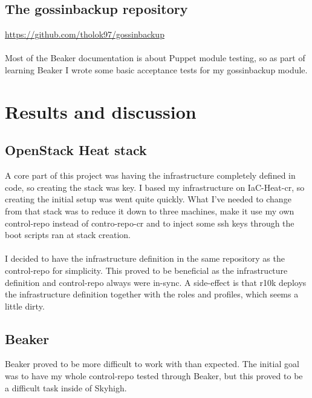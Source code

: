 \subsection{The gossinbackup repository}

\url{https://github.com/tholok97/gossinbackup}
\\
\\
Most of the Beaker documentation is about Puppet module testing, so as part of learning Beaker I wrote some basic acceptance tests for my gossinbackup module.


\section{Results and discussion}

\subsection{OpenStack Heat stack}

A core part of this project was having the infrastructure completely defined in code, so creating the stack was key. I based my infrastructure on IaC-Heat-cr\cite{iacheatcrgithub}, so creating the initial setup was went quite quickly. What I've needed to change from that stack was to reduce it down to three machines, make it use my own control-repo instead of contro-repo-cr\cite{controlrepocr} and to inject some ssh keys through the boot scripts ran at stack creation.
\\
\\
I decided to have the infrastructure definition in the same repository as the control-repo for simplicity. This proved to be beneficial as the infrastructure definition and control-repo always were in-sync. A side-effect is that r10k deploys the infrastructure definition together with the roles and profiles, which seems a little dirty. 

\subsection{Beaker}

Beaker proved to be more difficult to work with than expected. The initial goal was to have my whole control-repo tested through Beaker, but this proved to be a difficult task inside of Skyhigh. 

